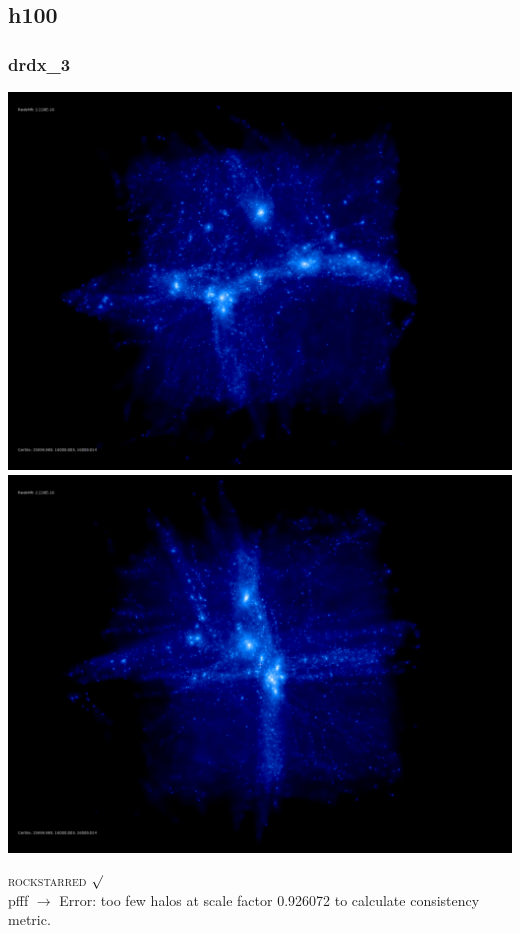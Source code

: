 \documentclass[a4paper,11pt,fleqn,oneside]{book}
\begin{document}
\newpage
\subsection{h100} %

\subsubsection{drdx\_3} 

\includegraphics[scale=0.12]{drdx_3/rotate_00185.jpg} 
\includegraphics[scale=0.12]{drdx_3/rotate_00136.jpg} 

\textsc{rockstarred} $\surd$  \\
pfff $\rightarrow$ Error: too few halos at scale factor 0.926072 to calculate consistency metric.
\end{document}
